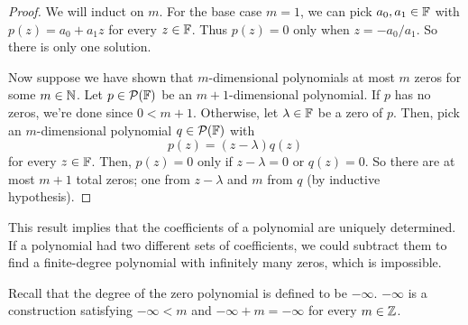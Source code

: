 \begin{proof}
    We will induct on $m$. For the base case $m=1$, we can pick $a_0, a_1\in \mathbb F$ with $p(z) = a_0 + a_1z$ for every $z\in \mathbb F$. Thus $p(z) = 0$ only when $z = -a_0/a_1$. So there is only one solution.

    Now suppose we have shown that $m$-dimensional polynomials at most $m$ zeros for some $m\in\mathbb{N}$. Let $p\in\mathcal{P}(\mathbb F)$ be an $m+1$-dimensional polynomial. If $p$ has no zeros, we're done since $0 < m+1$. Otherwise, let $\lambda \in\mathbb F$ be a zero of $p$. Then, pick an $m$-dimensional polynomial $q\in\mathcal{P}(\mathbb F)$ with
    \[ p(z) = (z - \lambda)q(z) \]
    for every $z\in\mathbb F$. Then, $p(z) = 0$ only if $z-\lambda = 0$ or $q(z) = 0$. So there are at most $m+1$ total zeros; one from $z-\lambda$ and $m$ from $q$ (by inductive hypothesis).
\end{proof}
This result implies that the coefficients of a polynomial are uniquely determined. If a polynomial had two different sets of coefficients, we could subtract them to find a finite-degree polynomial with infinitely many zeros, which is impossible.

Recall that the degree of the zero polynomial is defined to be $-\infty$. $-\infty$ is a construction satisfying $-\infty < m$ and $-\infty + m = -\infty$ for every $m\in\mathbb{Z}$.
